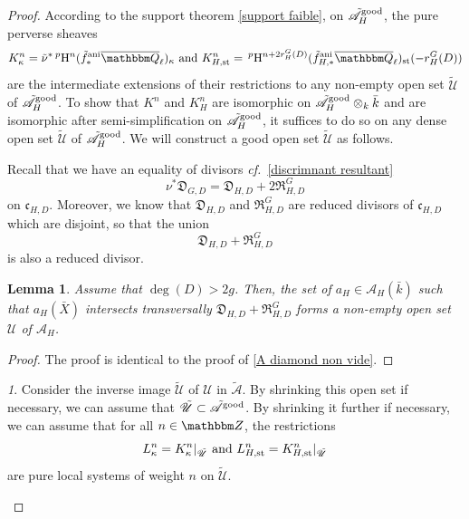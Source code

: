 \documentclass[12pt,english]{smfart}
\numberwithin{equation}{subsection}
\newtheorem{lemme}[equation]{Lemma}
\theoremstyle{remark}
\newtheorem{numero}[equation]{}
\newcommand\calA{{\mathscr A}}
\newcommand\calU{{\mathscr U}}
\newcommand\frakc{{\mathfrak c}}
\newcommand\ZZ{{\mathbbm Z}}
\newcommand\QQ{{\mathbbm Q}}
\newcommand\rmH{{\rm H}}
\newcommand\cf{{\it cf.\ }}
\newcommand\ani{{\rm ani}}
\newcommand\Ql{{\overline\QQ_\ell}}
\newcommand\resultant{\mathfrak R}
\newcommand\discrim{\mathfrak D}
\begin{document}
\begin{proof}
According to the support theorem \ref{support faible}, on
$\tilde\calA_H^{\rm good}$, the pure perverse sheaves
$$K^n_\kappa=\tilde\nu^*\, ^p\rmH^{n}(\tilde f^\ani_*\Ql)_{\kappa}
\ {\rm and}\ K_{H,{\rm st}}^{n}=\,^p\rmH^{n+2r_H^G(D)}(\tilde
f^\ani_{H,*}\Ql)_{\rm st}(-r_H^G(D))
$$
are the intermediate extensions of their restrictions to any non-empty open set
$\tilde\calU$ of $\tilde\calA_H^{\rm good}$. To show that
$K^n$ and $K^n_H$ are isomorphic on $\tilde\calA_H^{\rm good}\otimes_k
\bar k$ and are isomorphic after semi-simplification on
$\tilde\calA_H^{\rm good}$, it suffices to do so on any dense open set
$\tilde\calU$ of $\tilde\calA_H^{\rm good}$. We will construct a good
open set $\tilde\calU$ as follows.

Recall that we have an equality of divisors \cf \ref{discrimnant resultant}
$$ \nu^* \discrim_{G,D}= \discrim_{H,D}+2\resultant_{H,D}^G$$
on $\frakc_{H,D}$. Moreover, we know that $\discrim_{H,D}$ and
$\resultant_{H,D}^G$ are reduced divisors of $\frakc_{H,D}$
which are disjoint, so that the union
$$\discrim_{H,D}+\resultant_{H,D}^G$$
is also a reduced divisor.

\begin{lemme} Assume that $\deg(D)> 2g$. Then,
the set of $a_H\in \calA_H(\bar k)$ such that $a_H(\bar X)$ intersects
transversally $\discrim_{H,D}+\resultant_{H,D}^G$ forms a non-empty open set
$\calU$ of $\calA_H$.
\end{lemme}

\begin{proof}
The proof is identical to the proof of \ref{A diamond
non vide}.
\end{proof}

\begin{numero}
Consider the inverse image $\tilde\calU$ of $\calU$ in
$\tilde\calA$. By shrinking this open set if necessary, we can assume
that $\tilde\calU\subset \tilde\calA^{\rm good}$. By shrinking it further if
necessary, we can assume that for all $n\in\ZZ$, the restrictions
$$L^n_\kappa=K^n_\kappa|_{\tilde\calU}\ {\rm and}\ L_{H,{\rm st}}^n=K_{H,{\rm st}}^n|_{\tilde\calU}
$$
are pure local systems of weight $n$ on $\tilde\calU$.
\end{numero}


\end{proof}
\end{document}
